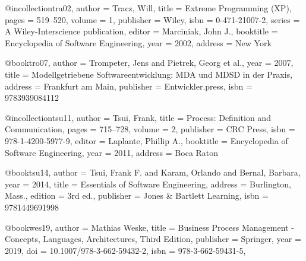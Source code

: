 %
%
%
%


@incollection{tra02,
 author = {Tracz, Will},
 title = {Extreme Programming (XP)},
 pages = {519--520},
 volume = {1},
 publisher = {Wiley},
 isbn = {0-471-21007-2},
 series = {A Wiley-Interscience publication},
 editor = {Marciniak, John J.},
 booktitle = {Encyclopedia of Software Engineering},
 year = {2002},
 address = {New York}
}


@book{tro07,
 author = {Trompeter, Jens and Pietrek, Georg et al.},
 year = {2007},
 title = {Modellgetriebene Softwareentwicklung: MDA und MDSD in der Praxis},
 address = {Frankfurt am Main},
 publisher = {Entwickler.press},
 isbn = {9783939084112}
}


@incollection{tsu11,
 author = {Tsui, Frank},
 title = {Process: Definition and Communication},
 pages = {715--728},
 volume = {2},
 publisher = {{CRC Press}},
 isbn = {978-1-4200-5977-9},
 editor = {Laplante, Phillip A.},
 booktitle = {Encyclopedia of Software Engineering},
 year = {2011},
 address = {Boca Raton}
}


@book{tsu14,
 author = {Tsui, Frank F. and Karam, Orlando and Bernal, Barbara},
 year = {2014},
 title = {Essentials of Software Engineering},
 address = {Burlington, Mass.},
 edition = {3rd ed.},
 publisher = {{Jones {\&} Bartlett Learning}},
 isbn = {9781449691998}
}


@book{wes19,
  author       = {Mathias Weske},
  title        = {Business Process Management - Concepts, Languages, Architectures,
                  Third Edition},
  publisher    = {Springer},
  year         = {2019},
  doi          = {10.1007/978-3-662-59432-2},
  isbn         = {978-3-662-59431-5},
}

